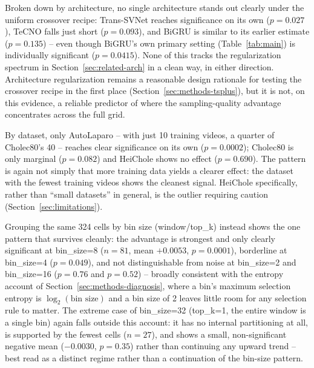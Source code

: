 \documentclass[preprint,12pt]{elsarticle}
\begin{document}
Broken down by architecture, no single architecture stands out clearly under the uniform crossover recipe: Trans-SVNet reaches significance on its own ($p=0.027$), TeCNO falls just short ($p=0.093$), and BiGRU is similar to its earlier estimate ($p=0.135$) -- even though BiGRU's own primary setting (Table~\ref{tab:main}) is individually significant ($p=0.0415$). None of this tracks the regularization spectrum in Section~\ref{sec:related-arch} in a clean way, in either direction. Architecture regularization remains a reasonable design rationale for testing the crossover recipe in the first place (Section~\ref{sec:methods-tsplus}), but it is not, on this evidence, a reliable predictor of where the sampling-quality advantage concentrates across the full grid.

By dataset, only AutoLaparo -- with just 10 training videos, a quarter of Cholec80's 40 -- reaches clear significance on its own ($p=0.0002$); Cholec80 is only marginal ($p=0.082$) and HeiChole shows no effect ($p=0.690$). The pattern is again not simply that more training data yields a clearer effect: the dataset with the fewest training videos shows the cleanest signal. HeiChole specifically, rather than ``small datasets'' in general, is the outlier requiring caution (Section~\ref{sec:limitations}).

Grouping the same 324 cells by bin size (window/top\_k) instead shows the one pattern that survives cleanly: the advantage is strongest and only clearly significant at bin\_size=8 ($n=81$, mean $+0.0053$, $p=0.0001$), borderline at bin\_size=4 ($p=0.049$), and not distinguishable from noise at bin\_size=2 and bin\_size=16 ($p=0.76$ and $p=0.52$) -- broadly consistent with the entropy account of Section~\ref{sec:methods-diagnosis}, where a bin's maximum selection entropy is $\log_2(\text{bin size})$ and a bin size of 2 leaves little room for any selection rule to matter. The extreme case of bin\_size=32 (top\_k=1, the entire window is a single bin) again falls outside this account: it has no internal partitioning at all, is supported by the fewest cells ($n=27$), and shows a small, non-significant negative mean ($-0.0030$, $p=0.35$) rather than continuing any upward trend -- best read as a distinct regime rather than a continuation of the bin-size pattern.
\end{document}
